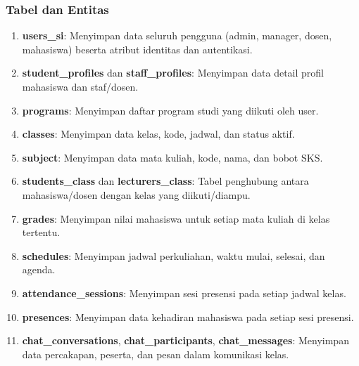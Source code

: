 \documentclass[a4paper,oneside,11pt]{book}
\begin{document}
\subsubsection{Tabel dan Entitas}
\begin{enumerate}
  \item \textbf{users\_si}: Menyimpan data seluruh pengguna (admin, manager, dosen, mahasiswa) beserta atribut identitas dan autentikasi.
  \item \textbf{student\_profiles} dan \textbf{staff\_profiles}: Menyimpan data detail profil mahasiswa dan staf/dosen.
  \item \textbf{programs}: Menyimpan daftar program studi yang diikuti oleh user.
  \item \textbf{classes}: Menyimpan data kelas, kode, jadwal, dan status aktif.
  \item \textbf{subject}: Menyimpan data mata kuliah, kode, nama, dan bobot SKS.
  \item \textbf{students\_class} dan \textbf{lecturers\_class}: Tabel penghubung antara mahasiswa/dosen dengan kelas yang diikuti/diampu.
  \item \textbf{grades}: Menyimpan nilai mahasiswa untuk setiap mata kuliah di kelas tertentu.
  \item \textbf{schedules}: Menyimpan jadwal perkuliahan, waktu mulai, selesai, dan agenda.
  \item \textbf{attendance\_sessions}: Menyimpan sesi presensi pada setiap jadwal kelas.
  \item \textbf{presences}: Menyimpan data kehadiran mahasiswa pada setiap sesi presensi.
  \item \textbf{chat\_conversations}, \textbf{chat\_participants}, \textbf{chat\_messages}: Menyimpan data percakapan, peserta, dan pesan dalam komunikasi kelas.
\end{enumerate}
\end{document}

